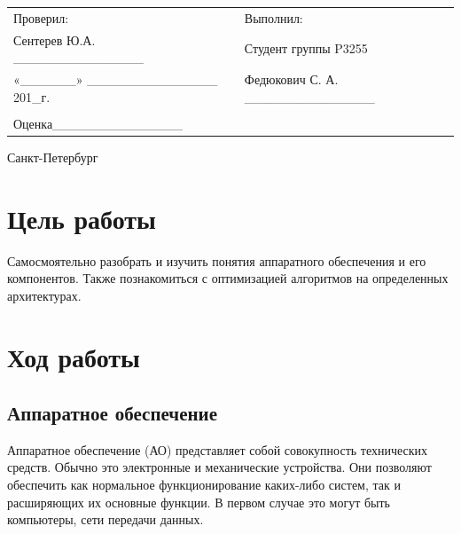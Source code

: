 \documentclass[12pt]{article}
\begin{document}
\begin{center}
\begin{tabular}{lllll}
Проверил:	 	  							& \hspace{80pt}	&	Выполнил:								&\\
Сентерев Ю.А.	 \_\_\_\_\_\_\_\_\_\_\_\_\_\_		&			&	Студент группы P3255					&\\
«\_\_\_\_\_\_» 	\_\_\_\_\_\_\_\_\_\_\_\_\_\_ 201\_г.	& 			&	Федюкович С. А. \_\_\_\_\_\_\_\_\_\_\_\_\_\_	&\\
										&			&										&\\
Оценка\hspace{12pt}\_\_\_\_\_\_\_\_\_\_\_\_\_\_	&			&										&\\
\end{tabular}
\par\bigskip\par\bigskip\par\bigskip
                                                  
\par\bigskip \par\bigskip
\end{center}
\par\bigskip\par\bigskip\par\bigskip\par\bigskip\par\bigskip\par\bigskip\par\bigskip\par\bigskip
\begin{center}
Санкт-Петербург
\par{}
\end{center}
\newpage
\pagestyle{plain}
\setcounter{page}{1}
	\section*{Цель работы}
	Самосмоятельно разобрать и изучить понятия аппаратного обеспечения и его компонентов. Также познакомиться с оптимизацией алгоритмов на определенных архитектурах. 

	\section*{Ход работы}
	\subsection*{Аппаратное обеспечение}
	Аппаратное обеспечение (АО) представляет собой совокупность технических средств. Обычно это электронные и механические устройства. Они позволяют обеспечить как нормальное функционирование каких-либо систем, так и расширяющих их основные функции. В первом случае это могут быть компьютеры, сети передачи данных.
	
\end{document}
